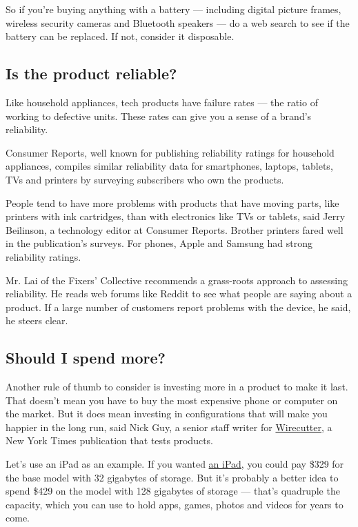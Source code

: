 So if you're buying anything with a battery --- including digital
picture frames, wireless security cameras and Bluetooth speakers --- do
a web search to see if the battery can be replaced. If not, consider it
disposable.

\hypertarget{is-the-product-reliable}{%
\subsection{Is the product reliable?}\label{is-the-product-reliable}}

Like household appliances, tech products have failure rates --- the
ratio of working to defective units. These rates can give you a sense of
a brand's reliability.

Consumer Reports, well known for publishing reliability ratings for
household appliances, compiles similar reliability data for smartphones,
laptops, tablets, TVs and printers by surveying subscribers who own the
products.

People tend to have more problems with products that have moving parts,
like printers with ink cartridges, than with electronics like TVs or
tablets, said Jerry Beilinson, a technology editor at Consumer Reports.
Brother printers fared well in the publication's surveys. For phones,
Apple and Samsung had strong reliability ratings.

Mr. Lai of the Fixers' Collective recommends a grass-roots approach to
assessing reliability. He reads web forums like Reddit to see what
people are saying about a product. If a large number of customers report
problems with the device, he said, he steers clear.

\hypertarget{should-i-spend-more}{%
\subsection{Should I spend more?}\label{should-i-spend-more}}

Another rule of thumb to consider is investing more in a product to make
it last. That doesn't mean you have to buy the most expensive phone or
computer on the market. But it does mean investing in configurations
that will make you happier in the long run, said Nick Guy, a senior
staff writer for
\href{https://www.nytimes3xbfgragh.onion/wirecutter/}{Wirecutter}, a New
York Times publication that tests products.

Let's use an iPad as an example. If you wanted
\href{https://www.nytimes3xbfgragh.onion/2020/04/21/technology/personaltech/apple-ipad-gadget-pandemic.html}{an
iPad}, you could pay \$329 for the base model with 32 gigabytes of
storage. But it's probably a better idea to spend \$429 on the model
with 128 gigabytes of storage --- that's quadruple the capacity, which
you can use to hold apps, games, photos and videos for years to come.

